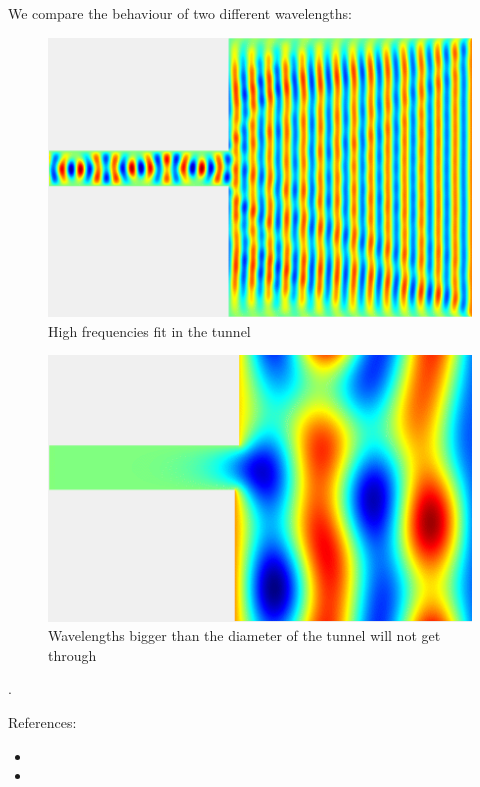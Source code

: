 \documentclass{article}
\begin{document}
We compare the behaviour of two different wavelengths:




\begin{figure}
  \includegraphics[width=\linewidth]{highfreq.gif}
  \caption{High frequencies fit in the tunnel}
\end{figure}


\begin{figure}
  \includegraphics[width=\linewidth]{lowfreq.gif}
  \caption{Wavelengths bigger than the diameter of the tunnel will not get through}
\end{figure}.



References: 
\begin{itemize}
\item {}
\item {}
\end{itemize}
\end{document}
